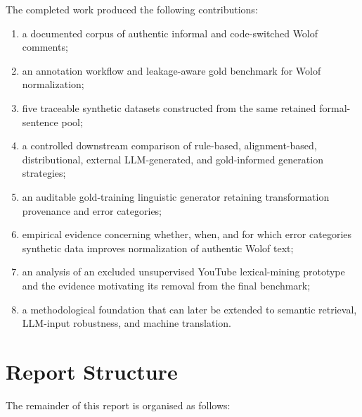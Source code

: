 \documentclass[12pt, a4paper, twoside, openany]{report}
\begin{document}
The completed work produced the following contributions:

\begin{enumerate}[noitemsep]
	\item a documented corpus of authentic informal and code-switched Wolof comments;
	\item an annotation workflow and leakage-aware gold benchmark for Wolof normalization;
	\item five traceable synthetic datasets constructed from the same retained formal-sentence pool;
	\item a controlled downstream comparison of rule-based, alignment-based, distributional, external LLM-generated, and gold-informed generation strategies;
	\item an auditable gold-training linguistic generator retaining transformation provenance and error categories;
	\item empirical evidence concerning whether, when, and for which error categories synthetic data improves normalization of authentic Wolof text;
	\item an analysis of an excluded unsupervised YouTube lexical-mining prototype and the evidence motivating its removal from the final benchmark;
	\item a methodological foundation that can later be extended to semantic retrieval, LLM-input robustness, and machine translation.
\end{enumerate}


\section{Report Structure}

The remainder of this report is organised as follows:
\end{document}
